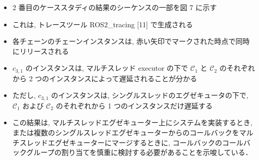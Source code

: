 \begin{frame}{}
    \begin{itemize}
        \item 2 番目のケーススタディの結果のシーケンスの一部を図 7 に示す
\item これは, トレースツール ROS2\_tracing [11] で生成される
\item 各チェーンのチェーンインスタンスは, 赤い矢印でマークされた時点で同時にリリースされる
\item $c_{3,1}$ のインスタンスは, マルチスレッド executor の下で $\mathcal{C}_{1}$ と $\mathcal{C}_{2}$ のそれぞれから 2 つのインスタンスによって遅延されることが分かる
\item ただし, $c_{3,1}$ のインスタンスは, シングルスレッドのエグゼキュータの下で, $\mathcal{C}_{1}$ および $\mathcal{C}_{2}$ のそれぞれから 1 つのインスタンスだけ遅延する
\item この結果は, マルチスレッドエグゼキューター上にシステムを実装するとき, または複数のシングルスレッドエグゼキューターからのコールバックをマルチスレッドエグゼキューターにマージするときに, コールバックのコールバックグループの割り当てを慎重に検討する必要があることを示唆している．
    \end{itemize}
\end{frame}
